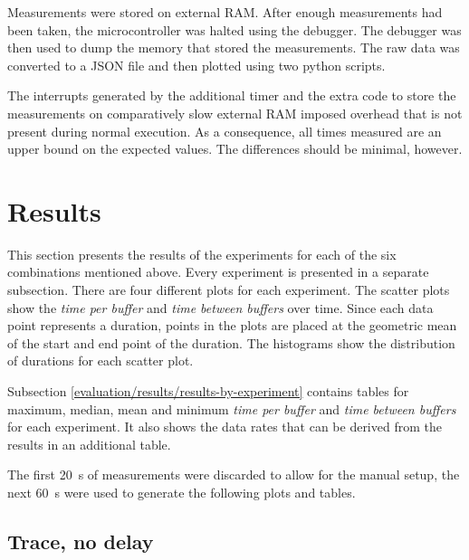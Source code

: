 Measurements were stored on external RAM. After enough measurements had been taken, the microcontroller
was halted using the debugger. The debugger was then used to dump the memory that stored the
measurements. The raw data was converted to a JSON file and then plotted using two python scripts.

The interrupts generated by the additional timer and the extra code to store the measurements on
comparatively slow external RAM imposed overhead that is not present during normal execution. As a
consequence, all times measured are an upper bound on the expected values. The differences should be
minimal, however.

\section{Results}
\label{evaluation/results}

This section presents the results of the experiments for each of the six combinations mentioned
above. Every experiment is presented in a separate subsection. There are four different plots
for each experiment. The scatter plots show the \textit{time per buffer} and
\textit{time between buffers} over time. Since each data point represents a duration, points in the
plots are placed at the geometric mean of the start and end point of the duration. The histograms
show the distribution of durations for each scatter plot.

Subsection \ref{evaluation/results/results-by-experiment} contains tables for maximum, median, mean
and minimum \textit{time per buffer} and \textit{time between buffers} for each experiment. It also
shows the data rates that can be derived from the results in an additional table.

The first \SI{20}{\second} of measurements were discarded to allow for the manual setup, the next
\SI{60}{\second} were used to generate the following plots and tables.

\clearpage
\subsection{Trace, no delay}
\label{evaluation/results/trace-no-delay}

